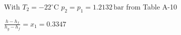 With \( T_2 = -22^\circ \text{C} \)  
\( p_2 = p_1 = 1.2132 \, \text{bar} \) from Table A-10  

\( \frac{h - h_f}{h_g - h_f} = x_1 = 0.3347 \)